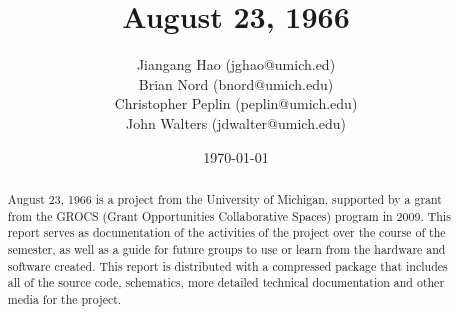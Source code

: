 \documentclass[11pt]{report}
\date{\today}
\begin{document}
\title{August 23, 1966}
\author{
        Jiangang Hao (jghao@umich.ed) \\
        Brian Nord (bnord@umich.edu) \\
        Christopher Peplin (peplin@umich.edu) \\
        John Walters (jdwalter@umich.edu)
}
\maketitle

\begin{abstract}\centering
August 23, 1966 is a project from the University of Michigan, supported by a
grant from the GROCS (Grant Opportunities Collaborative Spaces) program in 2009.
This report serves as documentation of the activities of the project over the
course of the semester, as well as a guide for future groups to use or learn
from the hardware and software created. This report is distributed with a compressed package that includes all of the source code, schematics, more detailed technical documentation and other media for the project.
\end{abstract}

\tableofcontents







\end{document}
